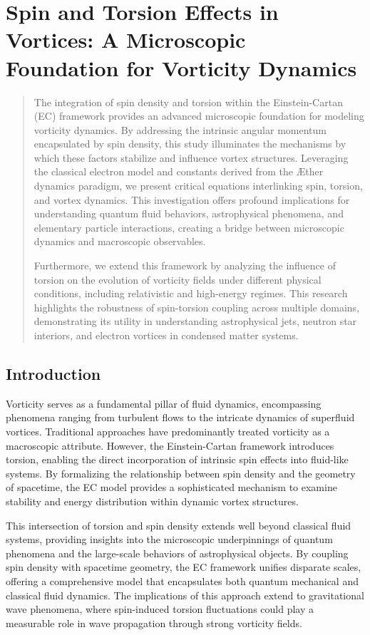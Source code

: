 
\section{Spin and Torsion Effects in Vortices: A Microscopic Foundation for Vorticity Dynamics}


\begin{abstract}
The integration of spin density and torsion within the Einstein-Cartan (EC) framework provides an advanced microscopic foundation for modeling vorticity dynamics. By addressing the intrinsic angular momentum encapsulated by spin density, this study illuminates the mechanisms by which these factors stabilize and influence vortex structures. Leveraging the classical electron model and constants derived from the Æther dynamics paradigm, we present critical equations interlinking spin, torsion, and vortex dynamics. This investigation offers profound implications for understanding quantum fluid behaviors, astrophysical phenomena, and elementary particle interactions, creating a bridge between microscopic dynamics and macroscopic observables.


Furthermore, we extend this framework by analyzing the influence of torsion on the evolution of vorticity fields under different physical conditions, including relativistic and high-energy regimes. This research highlights the robustness of spin-torsion coupling across multiple domains, demonstrating its utility in understanding astrophysical jets, neutron star interiors, and electron vortices in condensed matter systems.
\end{abstract}


\subsection*{Introduction}


Vorticity serves as a fundamental pillar of fluid dynamics, encompassing phenomena ranging from turbulent flows to the intricate dynamics of superfluid vortices. Traditional approaches have predominantly treated vorticity as a macroscopic attribute. However, the Einstein-Cartan framework introduces torsion, enabling the direct incorporation of intrinsic spin effects into fluid-like systems. By formalizing the relationship between spin density and the geometry of spacetime, the EC model provides a sophisticated mechanism to examine stability and energy distribution within dynamic vortex structures.


This intersection of torsion and spin density extends well beyond classical fluid systems, providing insights into the microscopic underpinnings of quantum phenomena and the large-scale behaviors of astrophysical objects. By coupling spin density with spacetime geometry, the EC framework unifies disparate scales, offering a comprehensive model that encapsulates both quantum mechanical and classical fluid dynamics. The implications of this approach extend to gravitational wave phenomena, where spin-induced torsion fluctuations could play a measurable role in wave propagation through strong vorticity fields.


